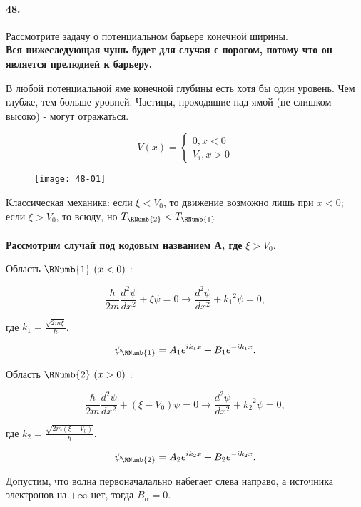


	\paragraph{48.}
	Рассмотрите задачу о потенциальном барьере конечной ширины.\\
	
	\textbf{Вся нижеследующая чушь будет для случая с порогом, потому что он является прелюдией к барьеру.}
	
	В любой потенциальной яме конечной глубины есть хотя бы один уровень. Чем глубже, тем больше уровней. Частицы, проходящие над ямой (не слишком высоко) - могут отражаться.
	
	\begin{equation*}
	V(x) = 
	\begin{cases}
	0 , x < 0 \\
	V_i , x > 0
	\end{cases}
	\end{equation*}
	\begin{wrapfigure}{L}{.4\linewidth}
	\texttt{[image: 48-01]}
	\end{wrapfigure}
	Классическая механика: если $\xi < V_0$, то движение возможно лишь при $x < 0$; если $\xi > V_0$, то всюду, но $T_{\RNumb{2}} < T_{\RNumb{1}}$
	\\\\
	\textbf{Рассмотрим случай под кодовым названием А, где} $\xi > V_0$.
	
	Область $\RNumb{1} \ (x<0)$ : 
	
	$$\frac{\hbar}{2m} \frac{d^2 \psi}{dx^2} + \xi \psi = 0 \rightarrow \frac{d^2 \psi}{dx^2}+{k_1}^2 \psi = 0,$$
	
	где $k_1 = \frac{\sqrt{2m\xi}}{\hbar}$.
	
	$$\psi_{\RNumb{1}} = A_1 e^{i k_1 x} + B_1 e^{-i k_1 x}.$$
	
	Область $\RNumb{2} \ (x>0)$ :
	
	$$\frac{\hbar}{2m} \frac{d^2 \psi}{dx^2} + (\xi - V_0) \psi = 0 \rightarrow \frac{d^2 \psi}{dx^2}+{k_2}^2 \psi = 0,$$
	
	где $k_2 = \frac{\sqrt{2m(\xi - V_0)}}{\hbar}$.
	
	$$\psi_{\RNumb{2}} = A_2 e^{i k_2 x} + B_2 e^{-i k_2 x}.$$
	
	Допустим, что волна первоначалально набегает слева направо, а источника электронов на $+ \infty$ нет, тогда $B_\alpha = 0$.
	
